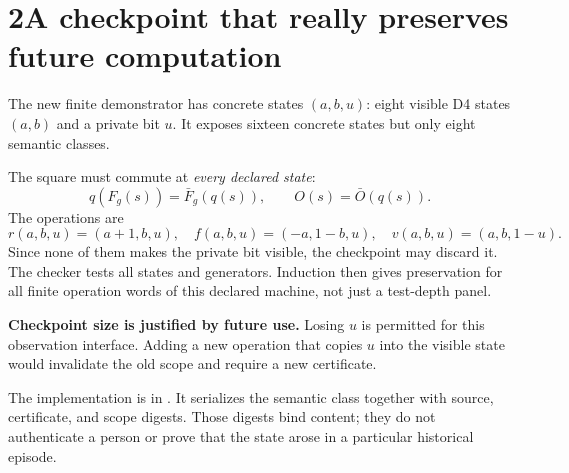 \documentclass[11pt]{article}
\begin{document}
\section*{2\quad A checkpoint that really preserves future computation}
The new finite demonstrator has concrete states $(a,b,u)$: eight visible D4 states $(a,b)$ and a private bit $u$. It exposes sixteen concrete states but only eight semantic classes.
\begin{center}
\end{center}
The square must commute at \emph{every declared state}:
\[
 q(F_g(s))=\bar F_g(q(s)),\qquad O(s)=\bar O(q(s)).
\]
The operations are
\[
 r(a,b,u)=(a+1,b,u),\quad f(a,b,u)=(-a,1-b,u),\quad v(a,b,u)=(a,b,1-u).
\]
Since none of them makes the private bit visible, the checkpoint may discard it. The checker tests all states and generators. Induction then gives preservation for all finite operation words of this declared machine, not just a test-depth panel.

\begin{scopebox}
\textbf{Checkpoint size is justified by future use.} Losing $u$ is permitted for this observation interface. Adding a new operation that copies $u$ into the visible state would invalidate the old scope and require a new certificate.
\end{scopebox}
The implementation is in . It serializes the semantic class together with source, certificate, and scope digests. Those digests bind content; they do not authenticate a person or prove that the state arose in a particular historical episode.
\clearpage
\end{document}
